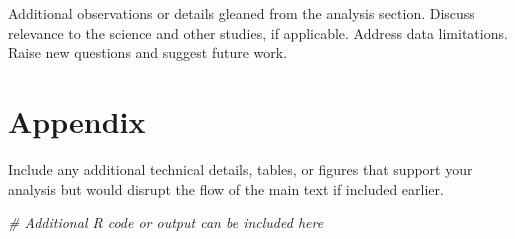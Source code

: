 \documentclass[
]{article}
\newenvironment{Shaded}{\begin{snugshade}}{\end{snugshade}}
\newcommand{\CommentTok}[1]{\textcolor[rgb]{0.56,0.35,0.01}{\textit{#1}}}
\begin{document}
Additional observations or details gleaned from the analysis section.
Discuss relevance to the science and other studies, if applicable.
Address data limitations. Raise new questions and suggest future work.

\section{Appendix}\label{appendix}

Include any additional technical details, tables, or figures that
support your analysis but would disrupt the flow of the main text if
included earlier.

\begin{Shaded}
\begin{Highlighting}[]
\CommentTok{\# Additional R code or output can be included here}
\end{Highlighting}
\end{Shaded}
\end{document}
